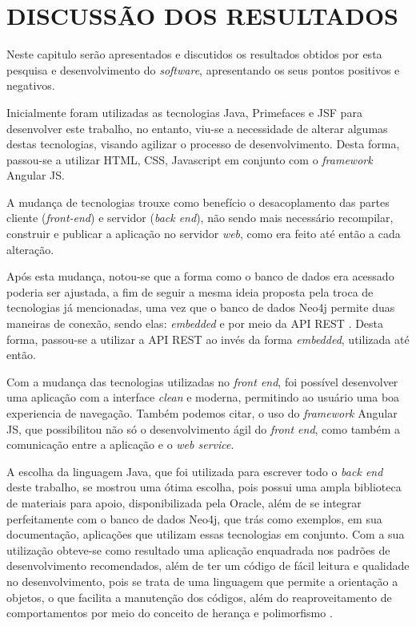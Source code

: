 
\chapter{DISCUSSÃO DOS RESULTADOS} 

\par Neste capitulo serão apresentados e discutidos os resultados obtidos por esta pesquisa e desenvolvimento do \textit{software}, apresentando os seus pontos positivos e negativos.

\par Inicialmente foram utilizadas as tecnologias Java, Primefaces e JSF para desenvolver este trabalho, no entanto, viu-se a necessidade de alterar algumas destas tecnologias, visando agilizar o processo de desenvolvimento. Desta forma, passou-se a utilizar HTML, CSS, Javascript em conjunto com o \textit{framework} Angular JS.

\par A mudança de tecnologias trouxe como benefício o desacoplamento das partes cliente (\textit{front-end}) e servidor (\textit{back end}), não sendo mais necessário recompilar, construir e publicar a aplicação no servidor \textit{web}, como era feito até então a cada alteração.

\par Após esta mudança, notou-se que a forma como o banco de dados era acessado poderia ser ajustada, a fim de seguir a mesma ideia proposta pela troca de tecnologias já mencionadas, uma vez que o banco de dados Neo4j permite duas maneiras de conexão, sendo elas: \textit{embedded} e por meio da API REST \cite{robinson_webber_eifrem_graph_databases}. Desta forma, passou-se a utilizar a API REST ao invés da forma \textit{embedded}, utilizada até então.

\par Com a mudança das tecnologias utilizadas no \textit{front end}, foi possível desenvolver uma aplicação com a interface \textit{clean} e moderna, permitindo ao usuário uma boa experiencia de navegação. Também podemos citar, o uso do \textit{framework} Angular JS, que possibilitou não só o desenvolvimento ágil do \textit{front end}, como também a comunicação entre a aplicação e o \textit{web service}.

\par A escolha da linguagem Java, que foi utilizada para escrever todo o \textit{back end} deste trabalho, se mostrou uma ótima escolha, pois possui uma ampla biblioteca de materiais para apoio, disponibilizada pela Oracle, além de se integrar perfeitamente com o banco de dados Neo4j, que trás como exemplos, em sua documentação, aplicações que utilizam essas tecnologias em conjunto. Com a sua utilização obteve-se como resultado uma aplicação enquadrada nos padrões de desenvolvimento recomendados, além de ter um código de fácil leitura e qualidade no desenvolvimento, pois se trata de uma linguagem que permite a orientação a objetos, o que facilita a manutenção dos códigos, além do reaproveitamento de comportamentos por meio do conceito de herança e polimorfismo \cite{schildt_java_complete_reference}.

